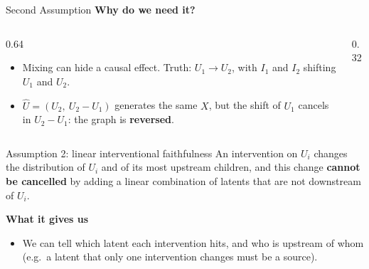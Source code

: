 \documentclass[11pt,aspectratio=169]{beamer}
\begin{document}
\begin{frame}{Second Assumption}
	\textbf{Why do we need it?}
	\begin{columns}[onlytextwidth,c]
		\begin{column}{0.64\textwidth}
			\begin{itemize}
				\item Mixing can hide a causal effect. Truth: $U_1 \to U_2$, with $I_1$ and $I_2$ shifting $U_1$ and $U_2$.
				\item $\hat U = (U_2,\ U_2 - U_1)$ generates the same $X$, but the shift of $U_1$ cancels in $U_2 - U_1$: the graph is \textbf{reversed}.
			\end{itemize}
		\end{column}
		\begin{column}{0.32\textwidth}
			\centering
		\end{column}
	\end{columns}
	\medskip
	\begin{block}{Assumption 2: linear interventional faithfulness}
		An intervention on $U_i$ changes the distribution of $U_i$ and of its most upstream children, and this change \textbf{cannot be cancelled} by adding a linear combination of latents that are not downstream of $U_i$.
	\end{block}
	\medskip
	\textbf{What it gives us}
	\begin{itemize}
		\item We can tell which latent each intervention hits, and who is upstream of whom (e.g.\ a latent that only one intervention changes must be a source).
	\end{itemize}
\end{frame}
\end{document}
